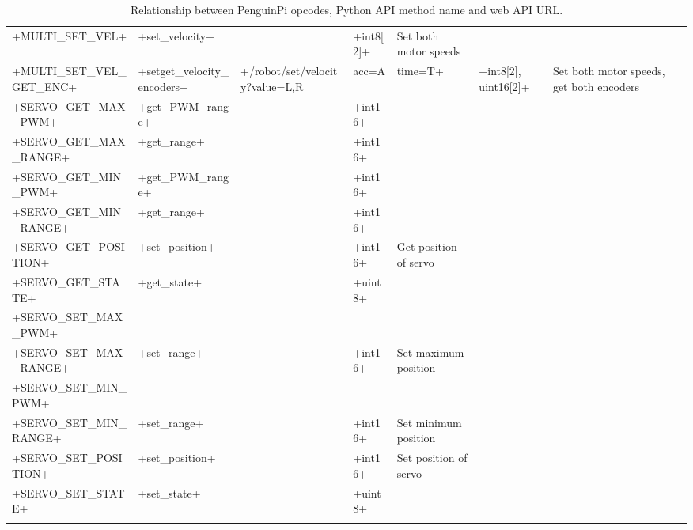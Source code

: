 \documentclass[11pt,fleqn]{article}
\begin{document}
\begin{landscape}
\begin{longtable}{|l|l|l|l|p{5cm}|}
+MULTI_SET_VEL+ & +set_velocity+ &                              & +int8[2]+ & Set both motor speeds \\
+MULTI_SET_VEL_GET_ENC+ & +setget_velocity_encoders+ & +/robot/set/velocity?value=L,R&acc=A&time=T+  & +int8[2], uint16[2]+ & Set both motor speeds, get both encoders  \\ \hline
+SERVO_GET_MAX_PWM+ & +get_PWM_range+ & & +int16+ & \\
+SERVO_GET_MAX_RANGE+ & +get_range+ & & +int16+ & \\
+SERVO_GET_MIN_PWM+ & +get_PWM_range+ & & +int16+ & \\
+SERVO_GET_MIN_RANGE+ & +get_range+ & &  +int16+ & \\
+SERVO_GET_POSITION+ & +set_position+ & & +int16+ & Get position of servo \\
+SERVO_GET_STATE+ & +get_state+ & & +uint8+ & \\ \hdashline
+SERVO_SET_MAX_PWM+ & & & &  \\
+SERVO_SET_MAX_RANGE+ & +set_range+ & & +int16+ & Set maximum position \\
+SERVO_SET_MIN_PWM+ &  & & &                                     \\
+SERVO_SET_MIN_RANGE+ & +set_range+ &             & +int16+ & Set minimum position \\
+SERVO_SET_POSITION+ & +set_position+ &                 & +int16+ & Set position of servo \\
+SERVO_SET_STATE+ & +set_state+ & & +uint8+ &\\  \hline
\caption{Relationship between PenguinPi opcodes, Python API method name and web API URL.}\label{tab:api-xref}
\end{longtable}
\end{landscape}


%
%
\end{document}
